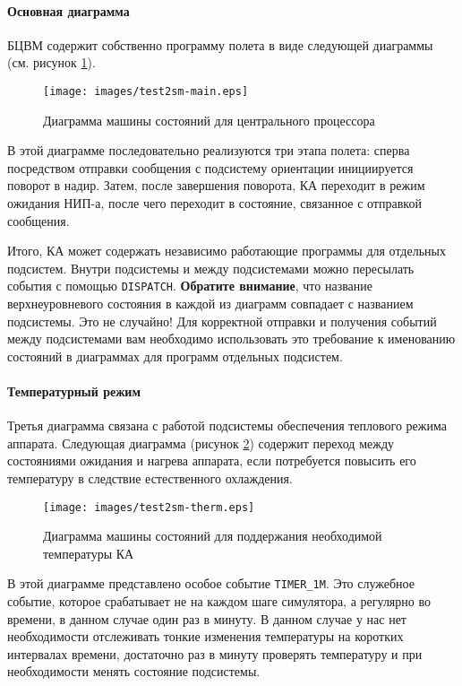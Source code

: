 \documentclass[12pt,a4paper]{article}
\begin{document}
\paragraph{Основная диаграмма} БЦВМ содержит собственно программу полета в виде следующей
диаграммы (см. рисунок \ref{Pic:Test2SM-Main}).

\begin{figure}[tbh]
  \begin{center}
    \texttt{[image: images/test2sm-main.eps]}
    \caption{Диаграмма машины состояний для центрального процессора}
    \label{Pic:Test2SM-Main}
  \end{center}
\end{figure}

В этой диаграмме последовательно реализуются три этапа полета: сперва посредством отправки
сообщения с подсистему ориентации инициируется поворот в надир. Затем, после завершения
поворота, КА переходит в режим ожидания НИП-а, после чего переходит в состояние, связанное
с отправкой сообщения.

Итого, КА может содержать независимо работающие программы для отдельных подсистем. Внутри
подсистемы и между подсистемами можно пересылать события с помощью
\verb'DISPATCH'. \textbf{Обратите внимание}, что название верхнеуровневого состояния в
каждой из диаграмм совпадает с названием подсистемы. Это не случайно! Для корректной
отправки и получения событий между подсистемами вам необходимо использовать это требование
к именованию состояний в диаграммах для программ отдельных подсистем.

\paragraph{Температурный режим} Третья диаграмма связана с работой подсистемы обеспечения
теплового режима аппарата. Следующая диаграмма (рисунок \ref{Pic:Test2SM-Therm}) содержит
переход между состояниями ожидания и нагрева аппарата, если потребуется повысить его
температуру в следствие естественного охлаждения.

\begin{figure}[tbh]
  \begin{center}
    \texttt{[image: images/test2sm-therm.eps]}
    \caption{Диаграмма машины состояний для поддержания необходимой температуры КА}
    \label{Pic:Test2SM-Therm}
  \end{center}
\end{figure}

В этой диаграмме представлено особое событие \verb'TIMER_1M'. Это служебное событие,
которое срабатывает не на каждом шаге симулятора, а регулярно во времени, в данном случае
один раз в минуту. В данном случае у нас нет необходимости отслеживать тонкие изменения
температуры на коротких интервалах времени, достаточно раз в минуту проверять температуру
и при необходимости менять состояние подсистемы.
\end{document}
